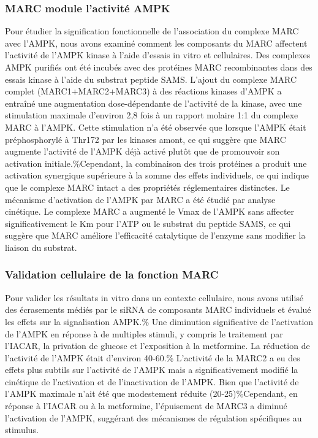 \documentclass[11pt,a4paper]{article}
\begin{document}
\subsubsection{MARC module l'activité AMPK}

Pour étudier la signification fonctionnelle de l'association du complexe MARC avec l'AMPK, nous avons examiné comment les composants du MARC affectent l'activité de l'AMPK kinase à l'aide d'essais in vitro et cellulaires. Des complexes AMPK purifiés ont été incubés avec des protéines MARC recombinantes dans des essais kinase à l'aide du substrat peptide SAMS. L'ajout du complexe MARC complet (MARC1+MARC2+MARC3) à des réactions kinases d'AMPK a entraîné une augmentation dose-dépendante de l'activité de la kinase, avec une stimulation maximale d'environ 2,8 fois à un rapport molaire 1:1 du complexe MARC à l'AMPK. Cette stimulation n'a été observée que lorsque l'AMPK était préphosphorylé à Thr172 par les kinases amont, ce qui suggère que MARC augmente l'activité de l'AMPK déjà activé plutôt que de promouvoir son activation initiale.\%Cependant, la combinaison des trois protéines a produit une activation synergique supérieure à la somme des effets individuels, ce qui indique que le complexe MARC intact a des propriétés réglementaires distinctes. Le mécanisme d'activation de l'AMPK par MARC a été étudié par analyse cinétique. Le complexe MARC a augmenté le Vmax de l'AMPK sans affecter significativement le Km pour l'ATP ou le substrat du peptide SAMS, ce qui suggère que MARC améliore l'efficacité catalytique de l'enzyme sans modifier la liaison du substrat.

\subsubsection{Validation cellulaire de la fonction MARC}

Pour valider les résultats in vitro dans un contexte cellulaire, nous avons utilisé des écrasements médiés par le siRNA de composants MARC individuels et évalué les effets sur la signalisation AMPK.\% Une diminution significative de l'activation de l'AMPK en réponse à de multiples stimuli, y compris le traitement par l'IACAR, la privation de glucose et l'exposition à la metformine. La réduction de l'activité de l'AMPK était d'environ 40-60.\% L'activité de la MARC2 a eu des effets plus subtils sur l'activité de l'AMPK mais a significativement modifié la cinétique de l'activation et de l'inactivation de l'AMPK. Bien que l'activité de l'AMPK maximale n'ait été que modestement réduite (20-25)\%Cependant, en réponse à l'IACAR ou à la metformine, l'épuisement de MARC3 a diminué l'activation de l'AMPK, suggérant des mécanismes de régulation spécifiques au stimulus.
\end{document}
